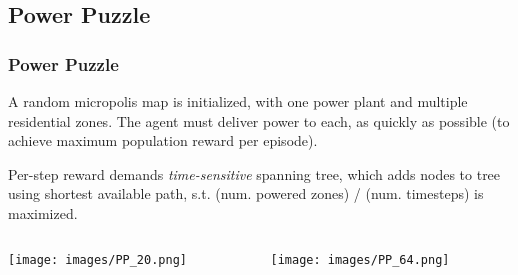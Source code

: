\documentclass[xcolor=dvipsnames]{beamer}
\begin{document}
\subsection{Power Puzzle}
\begin{frame}
\frametitle{Power Puzzle}
A random micropolis map is initialized, with one power plant and multiple residential zones. The agent must deliver power to each, as quickly as possible (to achieve maximum population reward per episode).
\begin{outline}
\1 Per-step reward demands \textit{time-sensitive} spanning tree, which adds nodes to tree using shortest available path, s.t. (num. powered zones) / (num. timesteps) is maximized.
\end{outline}
\end{frame}
\begin{frame}
    \begin{columns}
        \begin{column}{0.5\linewidth}
    \texttt{[image: images/PP\_20.png]}
        \end{column}
        \begin{column}{0.5\linewidth}
    \texttt{[image: images/PP\_64.png]}
        \end{column}
    \end{columns}
\end{frame}
\begin{frame}
\end{frame}
\end{document}
